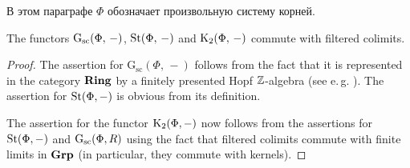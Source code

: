 \documentclass[oneside, 11pt]{amsart} \pdfoutput=1
\begin{document}
В этом параграфе $\Phi$ обозначает произвольную систему корней.

\begin{lemma}
\label{k2cdc} 
The functors $\mathrm{G}_\mathrm{sc}(\Phi,\,-)$, $\mathop{\mathrm{St}}\nolimits(\Phi,\,-)$ and ${\mathrm{K}}_2(\Phi,\,-)$ commute with filtered colimits.
\end{lemma}
\begin{proof}
The assertion for $\mathrm G_{\mathrm{sc}}(\Phi,\,-)$ follows from the fact that it is represented in the category ${\normalfont\textbf{Ring}}$ by a finitely presented Hopf $\mathbb{Z}$-algebra (see e.\,g. \cite[Lemma~10.127.3]{stacks-project}). The assertion for $\mathop{\mathrm{St}}\nolimits(\Phi, -)$ is obvious from its definition. 

The assertion for the functor ${\mathrm{K}}_2(\Phi, -)$ now follows from the assertions for $\mathop{\mathrm{St}}\nolimits(\Phi, -)$ and $\mathrm{G}_\mathrm{sc}(\Phi, R)$ using the fact that filtered colimits commute with finite limits in ${\normalfont\textbf{Grp}}$ (in particular, they commute with kernels).
\end{proof}

\begin{comment}
Пусть $R=\mathrm{colim}_I R_i$~--- направленный копредел колец. Покажем, что 
$$ \St(\Phi,\,R)=\mathrm{colim}_I\St(\Phi,\,R_i). $$ Для этого можно проверить универсальное свойство копредела. Если $f_i\colon\St(\Phi,\,R_i)\rightarrow G$, и $x_\alpha(r)\in\St(\Phi,\,R)$, можно найти $r'\in R_i$ для некоторого $i$ такой, что $r'$ переходит в $r$, и определить $f(x_\alpha(r))=f_i(x_\alpha(r'))$. Легко видеть, что такое определение не зависит от выбора $i$, и сохраняет соотношения Стейнберга. Тогда $f$ будет искомым отображением из $\St(\Phi,\,R)$ в $G$, замыкающим диаграмму до коммутативной. Единственность такого $g$ также легко проверить на образующих. \end{comment}

\begin{comment}
Теперь утверждение про $\K_2$ следует из того, что направленный копредел является точным функтором в категории групп, но поскольку я не знаю, где это написано, то привожу доказательство. Рассмотрим естественное отображение $$ f\colon\mathrm{colim}_I\K_2(\Phi,\,R_i)\rightarrow\K_2(\Phi,\,R), $$ и докажем, что оно является биекцией. Если $x\in\K_2(\Phi,\,R)$, то найдётся $y\in\St(\Phi,\,R_i)$ для некоторого $i$ по предыдущему пункту, который переходит в $x$. Пусть $\phi$ обозначает естественное отображение $$ \phi\colon\St(\Phi,\,-)\rightarrow\mathrm G_{\mathrm{sc}}(\Phi,\,-). $$ Поскольку $\phi(y)$ в пределе переходит в $1$, можно считать, что $\phi(y)=1$, то есть $y\in\K_2(\Phi,\,R_i)$. Это доказывает сюръективность $f$. Пусть теперь $x\in\mathrm{colim}_I\K_2(\Phi,\,R_i)$ переходит в $1$ под действием $f$. Тогда образ $x$ в $x\in\mathrm{colim}_I\St(\Phi,\,R_i)$ также равен $1$, и используя конструкцию прямого предела в категории групп $$ \left(\bigsqcup_i\K_2(\Phi,\,R_i)/\sim\right)\rightarrow\left(\bigsqcup_i\St(\Phi,\,R_i)/\sim\right), $$ мы заключаем, что $x$ равен $1$.
\end{comment}
\end{document}
